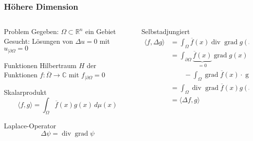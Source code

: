 %
%
%
\bgroup
\begin{frame}[t]
\setlength{\abovedisplayskip}{5pt}
\setlength{\belowdisplayskip}{5pt}
\frametitle{Höhere Dimension}
\vspace{-20pt}
\begin{columns}[t,onlytextwidth]
\begin{column}{0.44\textwidth}
\begin{block}{Problem}
Gegeben: $\Omega\subset\mathbb{R}^n$ ein Gebiet
\\
Gesucht: Lösungen von $\Delta u=0$ mit $u_{|\partial\Omega}=0$
\end{block}
\begin{block}{Funktionen}
Hilbertraum $H$ der Funktionen $f:\overline{\Omega}\to\mathbb{C}$
mit $f_{|\partial\Omega}=0$
\end{block}
\begin{block}{Skalarprodukt}
\[
\langle f,g\rangle
=
\int_{\Omega} \overline{f}(x) g(x)\,d\mu(x)
\]
\end{block}
\begin{block}{Laplace-Operator}
\[
\Delta \psi = \operatorname{div}\operatorname{grad}\psi
\]
\end{block}
\end{column}
\begin{column}{0.52\textwidth}
\begin{block}{Selbstadjungiert}
\begin{align*}
\langle f,\Delta g\rangle
&=
\int_{\Omega} \overline{f}(x)\operatorname{div}\operatorname{grad}g(x)\,d\mu(x)
\\
&=
\int_{\partial\Omega}
\underbrace{\overline{f}(x)}_{\displaystyle=0}\operatorname{grad}g(x)\,d\nu(x)
\\
&\qquad
-
\int_{\Omega}
\operatorname{grad}\overline{f}(x)\cdot \operatorname{grad}g(x)
\,d\mu(x)
\\
&=\int_{\Omega}\operatorname{div}\operatorname{grad}\overline{f}(x)g(x)\,d\mu(x)
\\
&=
\langle \Delta f,g\rangle
\end{align*}
\end{block}
\end{column}
\end{columns}
\end{frame}
\egroup
